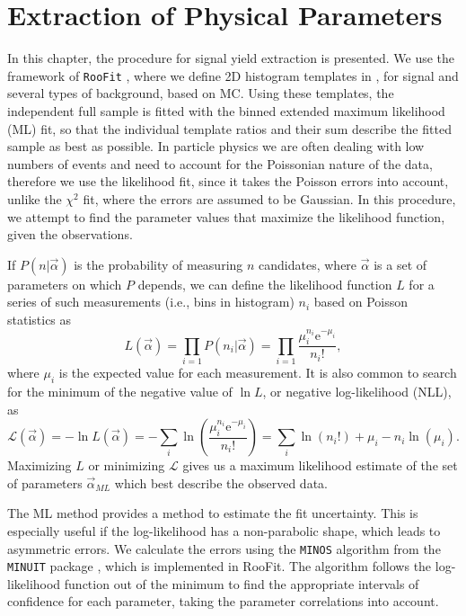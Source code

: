 \chapter{Extraction of Physical Parameters}
\label{sec:extraction-of-physical-parameters}
In this chapter, the procedure for signal yield extraction is presented. We use the framework of \texttt{RooFit} \cite{verkerke2006roofit}, where we define 2D histogram templates in \vars, for signal and several types of background, based on MC. Using these templates, the independent full sample is fitted with the binned extended maximum likelihood (ML) fit, so that the individual template ratios and their sum describe the fitted sample as best as possible. In particle physics we are often dealing with low numbers of events and need to account for the Poissonian nature of the data, therefore we use the likelihood fit, since it takes the Poisson errors into account, unlike the $\chi^2$ fit, where the errors are assumed to be Gaussian. In this procedure, we attempt to find the parameter values that maximize the likelihood function, given the observations.

If $P(n\vert\vec \alpha)$ is the probability of measuring $n$ candidates, where $\vec \alpha$ is a set of parameters on which $P$ depends, we can define the likelihood function $L$ for a series of such measurements (i.e., bins in histogram) $n_i$ based on Poisson statistics as
\begin{equation}
\label{eq:ML}
L(\vec \alpha) = \prod_{i=1} P(n_i|\vec \alpha) = \prod_{i=1} \frac{\mu_i^{n_i}\mathrm{e}^{-\mu_i}}{n_i!},
\end{equation}
where $\mu_i$ is the expected value for each measurement. It is also common to search for the minimum of the negative value of $\ln L$, or negative log-likelihood (NLL), as
\begin{equation}
\label{eq:NLL}
\mathcal{L}(\vec \alpha) = -\ln L(\vec \alpha) = -\sum_{i}\ln \left(\frac{\mu_i^{n_i}\mathrm{e}^{-\mu_i}}{n_i!}\right) = \sum_{i}\ln(n_i!) + \mu_i - n_i\ln(\mu_i).
\end{equation}
Maximizing $L$ or minimizing $\mathcal{L}$ gives us a maximum likelihood estimate of the set of parameters $\vec \alpha_{ML}$ which best describe the observed data. 

The ML method provides a method to estimate the fit uncertainty. This is especially useful if the log-likelihood has a non-parabolic shape, which leads to asymmetric errors. We calculate the errors using the \texttt{MINOS} algorithm from the \texttt{MINUIT} package \cite{James:1994vla}, which is implemented in RooFit. The algorithm follows the log-likelihood function out of the minimum to find the appropriate intervals of confidence for each parameter, taking the parameter correlations into account. 

